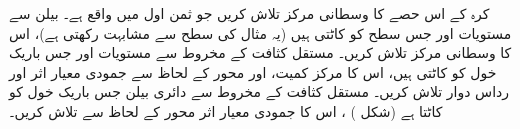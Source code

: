 کرہ  کے اس حصے  کا وسطانی  مرکز تلاش کریں  جو ثمن اول میں واقع ہے۔
بیلن  سے مستویات  اور   جس سطح  کو کاٹتی ہیں  (یہ   مثال کی سطح سے مشابہت رکھتی ہے)، اس کا   وسطانی  مرکز تلاش کریں۔
مستقل کثافت   کے مخروط  سے مستویات  اور  جس باریک خول کو  کاٹتی ہیں،  اس کا مرکز کمیت، اور محور  کے لحاظ سے جمودی  معیار اثر اور رداس  دوار تلاش کریں۔
مستقل کثافت   کے  مخروط   سے   دائری بیلن    جس باریک خول  کو کاٹتا ہے (شکل )   ،  اس کا  جمودی  معیار اثر محور  کے لحاظ سے  تلاش کریں۔
